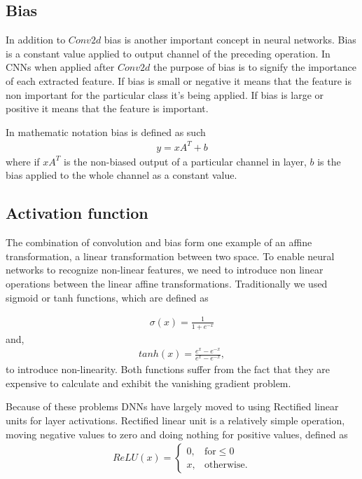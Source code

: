 \documentclass[12pt,a4paper,english
]{tunithesis}
\begin{document}
\subsection{Bias}
In addition to $Conv2d$ bias is another important concept in neural networks. Bias is a constant value applied to output channel of the preceding operation. In CNNs when applied after $Conv2d$ the purpose of bias is to signify the importance of each extracted feature. If bias is small or negative it means that the feature is non important for the particular class it's being applied. If bias is large or positive it means that the feature is important.

In mathematic notation bias is defined as such
\begin{align}
  y = xA^{T} + b
\end{align}
where if $xA^{T}$ is the non-biased output of a particular channel in layer, $b$ is the bias applied to the whole channel as a constant value.

\subsection{Activation function}
The combination of convolution and bias form one example of an affine transformation, a linear transformation between two space.
To enable neural networks to recognize non-linear features, we need to introduce non linear operations between the linear affine transformations. Traditionally we used sigmoid or tanh functions, which are defined as

\begin{align}
  \sigma(x) = \frac{1}{1+e^{-x}}
\end{align}
and,
\begin{align}
  tanh(x) = \frac{e^{x}-e^{-x}}{e^{x}-e^{-x}},
\end{align}
to introduce non-linearity. Both functions suffer from the fact that they are expensive to calculate and exhibit the vanishing gradient problem.~\parencite{DeepLearningBook}

Because of these problems DNNs have largely moved to using Rectified linear units for layer activations.
Rectified linear unit is a relatively simple operation, moving negative values to zero and doing nothing for positive values, defined as
\begin{align}
 ReLU(x) =
  \begin{cases}
  0, & \text{for} \leq 0 \\
    x, &  \text{otherwise}.
  \end{cases}
\end{align}
\end{document}
